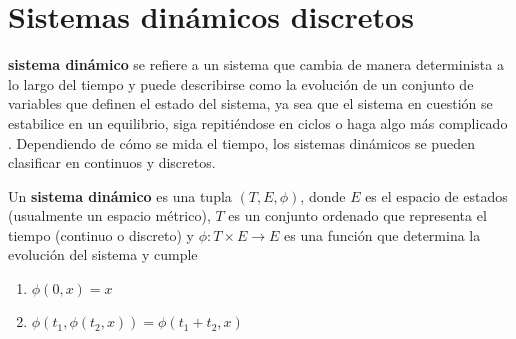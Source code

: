 \documentclass[../Main.tex]{subfiles}
\begin{document}
\section{Sistemas dinámicos discretos}


 \textbf{sistema dinámico} se refiere a un sistema que cambia de manera determinista a lo largo del tiempo y puede describirse como la evolución de un conjunto de variables que definen el estado del sistema, ya sea que el sistema en cuestión se estabilice en un equilibrio, siga repitiéndose en ciclos o haga algo más complicado \cite{Strogatz2018}. Dependiendo de cómo se mida el tiempo, los sistemas dinámicos se pueden clasificar en continuos y discretos. 

\begin{definition}
\label{def:sd}
    Un \textbf{sistema dinámico} es una tupla $(T,E,\phi)$, donde $E$ es el espacio de estados (usualmente un espacio métrico), $T$ es un conjunto ordenado que representa el tiempo (continuo o discreto) y $\phi:T\times E\rightarrow E$ es una función que determina la evolución del sistema y cumple \begin{enumerate}
        \item $\phi(0,x)=x$
        \item $\phi(t_1,\phi(t_2,x))=\phi(t_1+t_2,x)$
    \end{enumerate} 
\end{definition}
\end{document}
